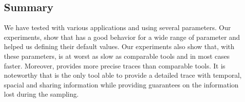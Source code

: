 \subsection{Summary}
\label{sec:expe-cncl}



We have tested \Moca with various applications and using several parameters.
Our experiments, show that \Moca has a good behavior for a wide range of parameter and
helped us defining their default values. Our experiments also show that, with these
parameters, \Moca is at worst as slow as comparable tools and in most 
cases faster. Moreover, \Moca provides more precise traces than comparable tools.
It is noteworthy that \Moca is the only tool able to provide a detailed trace with temporal,
spacial and sharing information while providing guarantees on the information
lost during the sampling.
